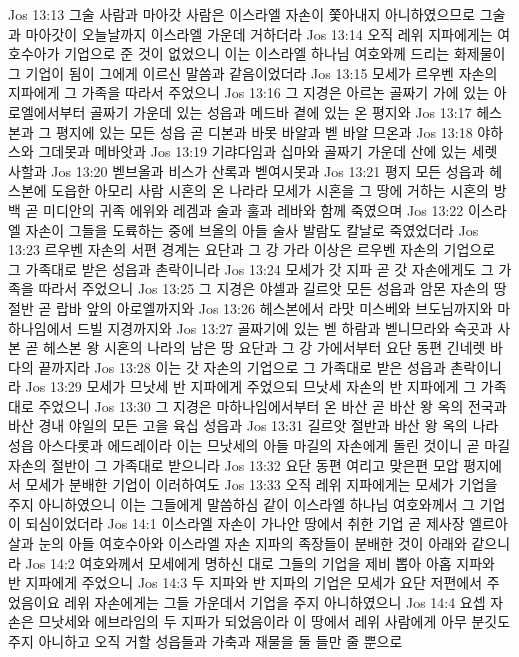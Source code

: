 Jos 13:13  그술 사람과 마아갓 사람은 이스라엘 자손이 쫓아내지 아니하였으므로 그술과 마아갓이 오늘날까지 이스라엘 가운데 거하더라
Jos 13:14  오직 레위 지파에게는 여호수아가 기업으로 준 것이 없었으니 이는 이스라엘 하나님 여호와께 드리는 화제물이 그 기업이 됨이 그에게 이르신 말씀과 같음이었더라
Jos 13:15  모세가 르우벤 자손의 지파에게 그 가족을 따라서 주었으니
Jos 13:16  그 지경은 아르논 골짜기 가에 있는 아로엘에서부터 골짜기 가운데 있는 성읍과 메드바 곁에 있는 온 평지와
Jos 13:17  헤스본과 그 평지에 있는 모든 성읍 곧 디본과 바못 바알과 벧 바알 므온과
Jos 13:18  야하스와 그데못과 메바앗과
Jos 13:19  기랴다임과 십마와 골짜기 가운데 산에 있는 세렛 사할과
Jos 13:20  벧브올과 비스가 산록과 벧여시못과
Jos 13:21  평지 모든 성읍과 헤스본에 도읍한 아모리 사람 시혼의 온 나라라 모세가 시혼을 그 땅에 거하는 시혼의 방백 곧 미디안의 귀족 에위와 레겜과 술과 훌과 레바와 함께 죽였으며
Jos 13:22  이스라엘 자손이 그들을 도륙하는 중에 브올의 아들 술사 발람도 칼날로 죽였었더라
Jos 13:23  르우벤 자손의 서편 경계는 요단과 그 강 가라 이상은 르우벤 자손의 기업으로 그 가족대로 받은 성읍과 촌락이니라
Jos 13:24  모세가 갓 지파 곧 갓 자손에게도 그 가족을 따라서 주었으니
Jos 13:25  그 지경은 야셀과 길르앗 모든 성읍과 암몬 자손의 땅 절반 곧 랍바 앞의 아로엘까지와
Jos 13:26  헤스본에서 라맛 미스베와 브도님까지와 마하나임에서 드빌 지경까지와
Jos 13:27  골짜기에 있는 벧 하람과 벧니므라와 숙곳과 사본 곧 헤스본 왕 시혼의 나라의 남은 땅 요단과 그 강 가에서부터 요단 동편 긴네렛 바다의 끝까지라
Jos 13:28  이는 갓 자손의 기업으로 그 가족대로 받은 성읍과 촌락이니라
Jos 13:29  모세가 므낫세 반 지파에게 주었으되 므낫세 자손의 반 지파에게 그 가족대로 주었으니
Jos 13:30  그 지경은 마하나임에서부터 온 바산 곧 바산 왕 옥의 전국과 바산 경내 야일의 모든 고을 육십 성읍과
Jos 13:31  길르앗 절반과 바산 왕 옥의 나라 성읍 아스다롯과 에드레이라 이는 므낫세의 아들 마길의 자손에게 돌린 것이니 곧 마길 자손의 절반이 그 가족대로 받으니라
Jos 13:32  요단 동편 여리고 맞은편 모압 평지에서 모세가 분배한 기업이 이러하여도
Jos 13:33  오직 레위 지파에게는 모세가 기업을 주지 아니하였으니 이는 그들에게 말씀하심 같이 이스라엘 하나님 여호와께서 그 기업이 되심이었더라
Jos 14:1  이스라엘 자손이 가나안 땅에서 취한 기업 곧 제사장 엘르아살과 눈의 아들 여호수아와 이스라엘 자손 지파의 족장들이 분배한 것이 아래와 같으니라
Jos 14:2  여호와께서 모세에게 명하신 대로 그들의 기업을 제비 뽑아 아홉 지파와 반 지파에게 주었으니
Jos 14:3  두 지파와 반 지파의 기업은 모세가 요단 저편에서 주었음이요 레위 자손에게는 그들 가운데서 기업을 주지 아니하였으니
Jos 14:4  요셉 자손은 므낫세와 에브라임의 두 지파가 되었음이라 이 땅에서 레위 사람에게 아무 분깃도 주지 아니하고 오직 거할 성읍들과 가축과 재물을 둘 들만 줄 뿐으로
